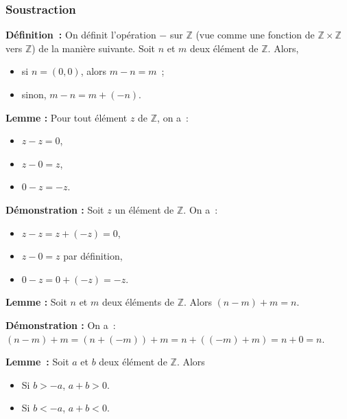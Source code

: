 \subsubsection{Soustraction}

\noindent\textbf{Définition :} 
    On définit l'opération $-$ sur $\mathbb{Z}$ (vue comme une fonction de $\mathbb{Z} \times \mathbb{Z}$ vers $\mathbb{Z}$) de la manière suivante.
    Soit $n$ et $m$ deux élément de $\mathbb{Z}$.
    Alors, 
    \begin{itemize}[nosep]
        \item si $n = (0,0)$, alors $m - n = m$ ;
        \item sinon, $m - n = m + (-n)$.
    \end{itemize}

\medskip

\noindent\textbf{Lemme :} Pour tout élément $z$ de $\mathbb{Z}$, on a :
    \begin{itemize}[nosep]
        \item $z - z = 0$,
        \item $z - 0 = z$,
        \item $0 - z = -z$.
    \end{itemize}

\medskip

\noindent\textbf{Démonstration :} Soit $z$ un élément de $\mathbb{Z}$. On a :
    \begin{itemize}[nosep]
        \item $z - z = z + (-z) = 0$,
        \item $z - 0 = z$ par définition,
        \item $0 - z = 0 + (-z) = -z$.
    \end{itemize}

   \done 

\medskip

\noindent\textbf{Lemme :} Soit $n$ et $m$ deux éléments de $\mathbb{Z}$.
    Alors $(n-m) + m = n$. 

\medskip

\noindent\textbf{Démonstration :} On a : $(n-m) + m = (n + (-m)) + m = n + ((-m) + m) = n + 0 = n$.

    \done

\medskip

\noindent\textbf{Lemme :} Soit $a$ et $b$ deux élément de $\mathbb{Z}$. 
    Alors 
    \begin{itemize}[nosep]
        \item Si $b > -a$, $a + b > 0$.
        \item Si $b < -a$, $a + b < 0$.
    \end{itemize}

